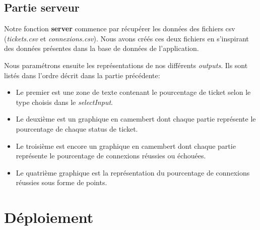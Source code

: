 \documentclass[12pt, a4paper]{article}
\begin{document}
\subsection*{Partie serveur}

Notre fonction \textbf{server} commence par récupérer les données des fichiers csv (\textit{tickets.csv} et \textit{connexions.csv}).
Nous avons créés ces deux fichiers en s'inspirant des données présentes dans la base de données de l'application.

\noindent Nous paramétrons ensuite les représentations de nos différents \textit{outputs}.
Ils sont listés dans l'ordre décrit dans la partie précédente:

\begin{itemize}
    \item Le premier est une zone de texte contenant le pourcentage de ticket selon le type choisis dans le \textit{selectInput}.
    \item Le deuxième est un graphique en camembert dont chaque partie représente le pourcentage de chaque status de ticket.
    \item Le troisième est encore un graphique en camembert dont chaque partie représente le pourcentage de connexions réussies ou échouées.
    \item Le quatrième graphique est la représentation du pourcentage de connexions réussies sous forme de points.
\end{itemize}

\section{Déploiement}
\end{document}
